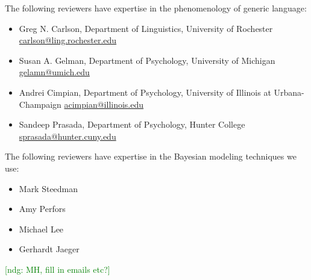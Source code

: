 \documentclass[11pt,stdletter,dateno,sigleft]{newlfm} %
\newcommand{\ndg}[1]{\textcolor{Green}{[ndg: #1]}}
\begin{document}
\begin{newlfm}
The following reviewers have expertise in the phenomenology of generic language:
\begin{itemize}
\item Greg N. Carlson, Department of Linguistics, University of Rochester \url{carlson@ling.rochester.edu}
\item Susan A. Gelman, Department of Psychology, University of Michigan \url{gelamn@umich.edu}
\item Andrei Cimpian, Department of Psychology, University of Illinois at Urbana-Champaign \url{acimpian@illinois.edu}
\item Sandeep Prasada, Department of Psychology, Hunter College \url{sprasada@hunter.cuny.edu}
\end{itemize}
The following reviewers have expertise in the Bayesian modeling techniques we use:
\begin{itemize}
\item Mark Steedman
\item Amy Perfors
\item Michael Lee
\item Gerhardt Jaeger
\end{itemize}

\ndg{MH, fill in emails etc?}




\end{newlfm}
\end{document}
